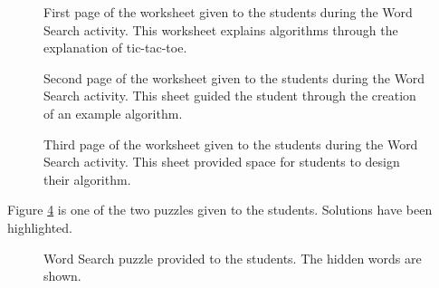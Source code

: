 \begin{figure}%
   \centering
   \caption[Word Search handout, page 1.]{First page of the worksheet given to the students during the Word Search activity. This worksheet explains algorithms through the explanation of tic-tac-toe.}
   \label{fig:StudentWorksheet1}
\end{figure}
	
\begin{figure}%
   \centering
   \caption[Word Search handout, page 2.]{Second page of the worksheet given to the students during the Word Search activity. This sheet guided the student through the creation of an example algorithm.}
   \label{fig:StudentWorksheet2}
\end{figure}
	
\begin{figure}%
   \centering
   \caption[Word Search handout, page 3.]{Third page of the worksheet given to the students during the Word Search activity. This sheet provided space for students to design their algorithm.}
   \label{fig:StudentWorksheet3}
\end{figure}

	\label{sec:wordsearchpuzzle}
	Figure \ref{fig:wordsearch-puzzle} is one of the two puzzles given to the students. Solutions have been highlighted.
	
	
	\begin{figure}%
   	\centering
   	\caption[Word Search puzzle.]{Word Search puzzle provided to the students. The hidden words are shown.}
   	\label{fig:wordsearch-puzzle}
	\end{figure}
	


